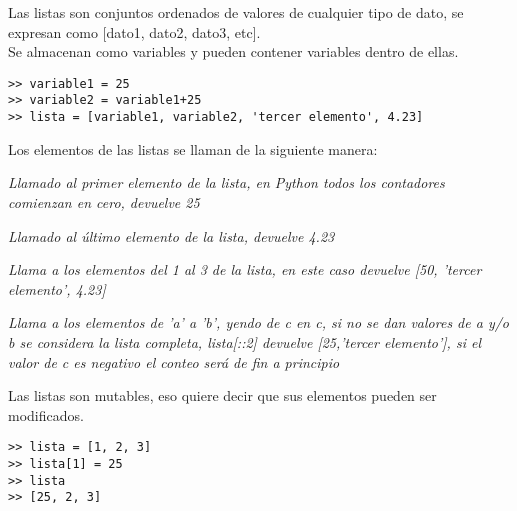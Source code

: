 \documentclass[10pt,a4paper]{article}
\begin{document}
\begin{description}[
align=right,
labelindent = 1cm,
labelsep=0.5cm,
itemindent=0cm]

\item [list] 
Las listas son conjuntos ordenados de valores de cualquier tipo de dato, se expresan como [dato1, dato2, dato3, etc].\\
Se almacenan como variables y pueden contener variables dentro de ellas.

\begin{lstlisting}
>> variable1 = 25
>> variable2 = variable1+25
>> lista = [variable1, variable2, 'tercer elemento', 4.23]\end{lstlisting} 
Los elementos de las listas se llaman de la siguiente manera:

\begin{description}[leftmargin=!,labelwidth=2.5cm,itemindent=0cm]
\item [{$>>$ lista[0]}] \textit{Llamado al primer elemento de la lista, en Python todos los contadores comienzan en cero, devuelve 25}
\item [{$>>$ lista[-1]}] \textit{Llamado al último elemento de la lista, devuelve 4.23}
\item [{$>>$ lista[1:3]}] \textit{Llama a los elementos del 1 al 3 de la lista, en este caso devuelve \emph{[50, 'tercer elemento', 4.23]}}
\item [{$>>$ lista[a:b:c]}] \textit{Llama a los elementos de 'a' a 'b', yendo de c en c, si no se dan valores de a y/o b se considera la lista completa, \emph{lista[::2]} devuelve \emph{[25,'tercer elemento']}, si el valor de c es negativo el conteo será de fin a principio}
\end{description}

Las listas son mutables, eso quiere decir que sus elementos pueden ser modificados.\\
\begin{lstlisting}
>> lista = [1, 2, 3]
>> lista[1] = 25
>> lista
>> [25, 2, 3]\end{lstlisting}


\end{description}
\end{document}
